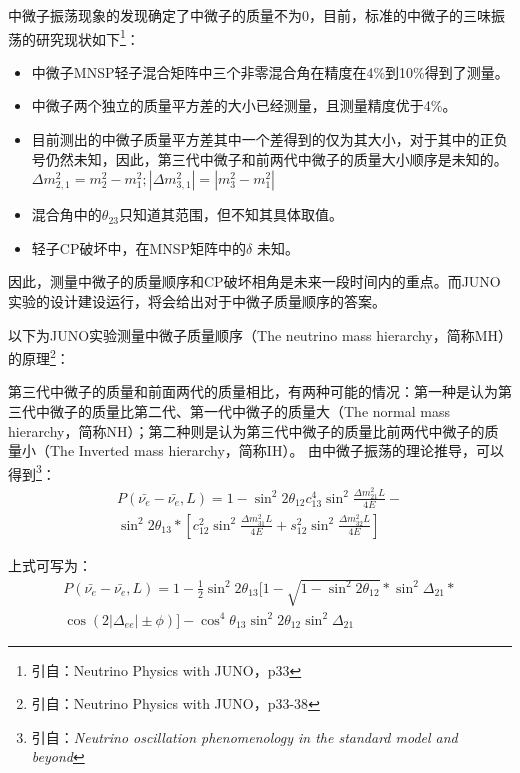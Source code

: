 \documentclass[10pt,a4paper]{article}
\begin{document}
中微子振荡现象的发现确定了中微子的质量不为0，目前，标准的中微子的三味振荡的研究现状如下{\footnote{引自：Neutrino Physics with JUNO，p33}}：
\begin{itemize}
	\item{中微子MNSP轻子混合矩阵中三个非零混合角在精度在4\%到10\%得到了测量。}
    \item{中微子两个独立的质量平方差的大小已经测量，且测量精度优于4\%。}
    \item{目前测出的中微子质量平方差其中一个差得到的仅为其大小，对于其中的正负号仍然未知，因此，第三代中微子和前两代中微子的质量大小顺序是未知的。$\Delta m_{2,1}^2=m_{2}^2-m_{1}^2;|\Delta m_{3,1}^2|=|m_{3}^2-m_{1}^2|$}
    \item{混合角中的$\theta_{23}$只知道其范围，但不知其具体取值。}
    \item{轻子CP破坏中，在MNSP矩阵中的$\delta$ 未知。}
\end{itemize}

因此，测量中微子的质量顺序和CP破坏相角是未来一段时间内的重点。而JUNO实验的设计建设运行，将会给出对于中微子质量顺序的答案。

以下为JUNO实验测量中微子质量顺序（The neutrino mass hierarchy，简称MH）的原理{\footnote{引自：Neutrino Physics with JUNO，p33-38}}：

第三代中微子的质量和前面两代的质量相比，有两种可能的情况：第一种是认为第三代中微子的质量比第二代、第一代中微子的质量大（The normal mass hierarchy，简称NH）；第二种则是认为第三代中微子的质量比前两代中微子的质量小（The Inverted mass hierarchy，简称IH）。
由中微子振荡的理论推导，可以得到\footnote{引自：\itshape{Neutrino oscillation phenomenology  in the standard model and beyond}  }：
\[
 \begin{split}
    \label{E1}
     P(\bar{\nu_e}-\bar{\nu_e},L)=1-{\sin^2{2\theta_{12}}} c_{13}^4\sin^2{\frac{\Delta{m_{21}^2}L}{4E}}-\\
\sin^2{2\theta_{13}} *[c_{12}^2\sin^2{\frac{\Delta{m_{31}^2}L}{4E}}+s_{12}^2\sin^2{\frac{\Delta{m_{32}^2}L}{4E}}]
 \end{split}
 \]

上式可写为：
 \begin{equation}
 \begin{split}
    \label{E1}
     P(\bar{\nu_e}-\bar{\nu_e},L)=1-\frac{1}{2}{\sin^2{2\theta_{13}}}[1-\sqrt{1-\sin^2{2\theta_{12}}}*\sin^2{\Delta_{21}}*\\\cos(2|\Delta_{ee}|\pm\phi)] -\cos^4{\theta_{13}}\sin^2{2\theta_{12}}\sin^2{\Delta_{21}} 
 \end{split}
 \end{equation}
\end{document}
